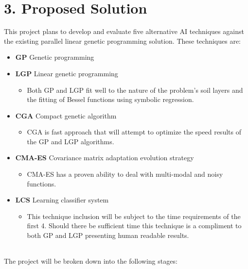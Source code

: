 \documentclass[11pt, a4paper, twoside, openright]{report}
\begin{document}
\section*{3. Proposed Solution}

This project plans to develop and evaluate five alternative AI techniques against the
existing parallel linear genetic programming solution. These techniques are:

\begin{itemize}
\item {\bf GP} Genetic programming 
\item {\bf LGP} Linear genetic programming 
\begin{itemize}
\item Both GP and LGP fit well to the nature of the problem's soil layers and the fitting of Bessel functions using symbolic regression\cite{poli1}.
\end{itemize}
\item {\bf CGA} Compact genetic algorithm 
\begin{itemize}
\item CGA is fast approach that will attempt to optimize the speed results of the GP and LGP algorithms\cite{harik1}.
\end{itemize}
\item {\bf CMA-ES} Covariance matrix adaptation evolution strategy 
\begin{itemize}
\item CMA-ES has a proven ability to deal with multi-modal\cite{hansen1} and noisy functions\cite{hansen2}.
\end{itemize}
\item {\bf LCS} Learning classifier system 
\begin{itemize}
\item This technique inclusion will be subject to the time requirements of the first 4. Should there be sufficient time this technique is a compliment to both GP and LGP presenting human readable results\cite{lanzi1}.
\end{itemize}
\end{itemize}
\\
The project will be broken down into the following stages:
\end{document}
